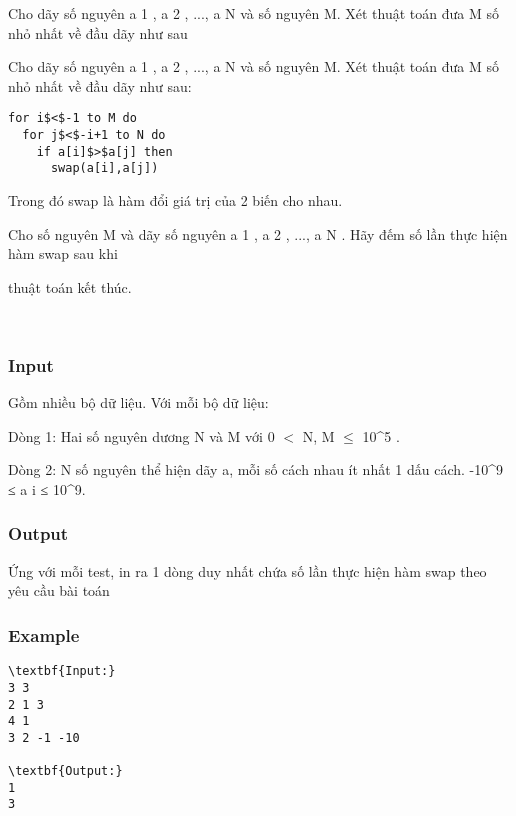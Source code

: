 

Cho dãy số nguyên a 1 , a 2 , ..., a N và số nguyên M. Xét thuật toán đưa M số nhỏ nhất về đầu dãy như sau

Cho dãy số nguyên a 1 , a 2 , ..., a N và số nguyên M. Xét thuật toán đưa M số nhỏ nhất về đầu dãy như sau:
\begin{verbatim}
for i$<$-1 to M do
  for j$<$-i+1 to N do
    if a[i]$>$a[j] then
      swap(a[i],a[j])\end{verbatim}

Trong đó swap là hàm đổi giá trị của 2 biến cho nhau.

Cho số nguyên M và dãy số nguyên a 1 , a 2 , ..., a N . Hãy đếm số lần thực hiện hàm swap sau khi

thuật toán kết thúc.

 

\subsubsection{Input}

Gồm nhiều bộ dữ liệu. Với mỗi bộ dữ liệu:

Dòng 1: Hai số nguyên dương N và M với 0 $<$ N, M  $\le$  10\textasciicircum5 .

Dòng 2: N số nguyên thể hiện dãy a, mỗi số cách nhau ít nhất 1 dấu cách. -10\textasciicircum9 ≤ a i ≤ 10\textasciicircum9.

\subsubsection{Output}

Ứng với mỗi test, in ra 1 dòng duy nhất chứa số lần thực hiện hàm swap theo yêu cầu bài toán

\subsubsection{Example}
\begin{verbatim}
\textbf{Input:}
3 3
2 1 3
4 1
3 2 -1 -10

\textbf{Output:}
1
3\end{verbatim}
